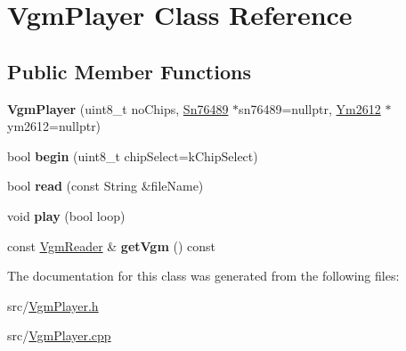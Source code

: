 \hypertarget{classVgmPlayer}{}\section{Vgm\+Player Class Reference}
\label{classVgmPlayer}
\subsection*{Public Member Functions}
\begin{DoxyCompactItemize}
\item 
\mbox{\label{classVgmPlayer_a4c35aa9bdf675a0db5c00d6e3879e12d}} 
{\bfseries Vgm\+Player} (uint8\+\_\+t no\+Chips, \mbox{\hyperlink{classSn76489}{Sn76489}} $\ast$sn76489=nullptr, \mbox{\hyperlink{classYm2612}{Ym2612}} $\ast$ym2612=nullptr)
\item 
\mbox{\label{classVgmPlayer_a5021e505b493e4d3e1b9557b2633ce40}} 
bool {\bfseries begin} (uint8\+\_\+t chip\+Select=k\+Chip\+Select)
\item 
\mbox{\label{classVgmPlayer_afdc518a8b12244d723d414e764dad744}} 
bool {\bfseries read} (const String \&file\+Name)
\item 
\mbox{\label{classVgmPlayer_aaae3f8ec33c2e3e5fe362d734176cb17}} 
void {\bfseries play} (bool loop)
\item 
\mbox{\label{classVgmPlayer_af430c4f3989886f289e6b40b9006037c}} 
const \mbox{\hyperlink{classVgmReader}{Vgm\+Reader}} \& {\bfseries get\+Vgm} () const
\end{DoxyCompactItemize}


The documentation for this class was generated from the following files\+:\begin{DoxyCompactItemize}
\item 
src/\mbox{\hyperlink{VgmPlayer_8h}{Vgm\+Player.\+h}}\item 
src/\mbox{\hyperlink{VgmPlayer_8cpp}{Vgm\+Player.\+cpp}}\end{DoxyCompactItemize}
